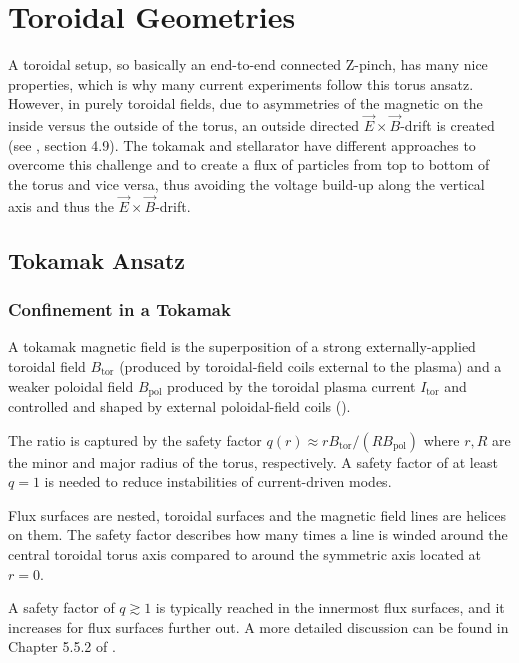 \section{Toroidal Geometries}

A toroidal setup, so basically an end-to-end connected Z-pinch, has many nice properties, which is why
many current experiments follow this torus ansatz.
However, in purely toroidal fields, due to asymmetries of the magnetic on the inside versus 
the outside of the torus, an outside directed $\vec{E}\times\vec{B}$-drift is created 
(see \cite{Freidberg2014}, section 4.9).
The tokamak and stellarator have different approaches to overcome this challenge
and to create a flux of particles from top to bottom of the torus and vice versa,
thus avoiding the voltage build-up along the vertical axis and thus the $\vec{E}\times\vec{B}$-drift.



\subsection{Tokamak Ansatz}

\subsubsection{Confinement in a Tokamak}
A tokamak magnetic field is the superposition of a strong externally-applied
toroidal field $B_\text{tor}$ (produced by toroidal-field coils external to the plasma)
and a weaker poloidal field $B_\text{pol}$ produced by the toroidal plasma current $I_\text{tor}$
and controlled and shaped by external poloidal-field coils (\cite{Freidberg2014}).


The ratio is captured by the safety factor $q(r) \approx rB_\text{tor}/(RB_\text{pol})$
where $r,R$ are the minor and major radius of the torus, respectively.
A safety factor of at least $q=1$ is needed to reduce instabilities of current-driven modes.

Flux surfaces are nested, toroidal surfaces and the magnetic field lines are helices on them.
The safety factor describes how many times a line is winded around the central toroidal torus
axis compared to around the symmetric axis located at $r=0$.

A safety factor of $q\gtrsim1$ is typically reached in the innermost flux surfaces,
and it increases for flux surfaces further out. 
A more detailed discussion can be found in Chapter 5.5.2 of \cite{Freidberg2014}.


